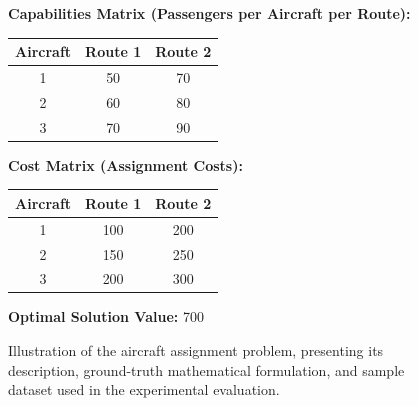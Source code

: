 \documentclass[review,12pt]{elsarticle}
\begin{document}
\begin{figure}[htbp]
{{\begin{tcolorbox}
\begin{tcolorbox}
\textbf{Capabilities Matrix (Passengers per Aircraft per Route):}
\vspace{-3mm}
\begin{center}
\begin{tabular}{|c|c|c|}
\hline
\textbf{Aircraft} & \textbf{Route 1} & \textbf{Route 2} \\ \hline
1 & 50 & 70 \\ \hline
2 & 60 & 80 \\ \hline
3 & 70 & 90 \\ \hline
\end{tabular}
\end{center}
\vspace{-3mm}
\textbf{Cost Matrix (Assignment Costs):}
\vspace{-6mm}
\begin{center}
\begin{tabular}{|c|c|c|}
\hline
\textbf{Aircraft} & \textbf{Route 1} & \textbf{Route 2} \\ \hline
1 & 100 & 200 \\ \hline
2 & 150 & 250 \\ \hline
3 & 200 & 300 \\ \hline
\end{tabular}
\end{center}
\vspace{-3mm}
\textbf{Optimal Solution Value:} 700
\end{tcolorbox}

\end{tcolorbox}
} %
}
\caption{Illustration of the aircraft assignment problem, presenting its description, ground-truth mathematical formulation, and sample dataset used in the experimental evaluation.}
\label{fig:aircraft_assignment_problem}
\end{figure}


\end{document}
